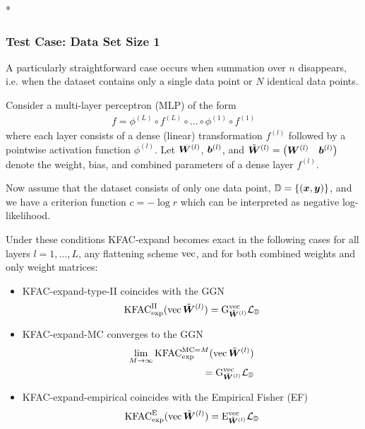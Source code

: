 \switchcolumn[1]*
\switchcolumn[0]

\subsubsection{Test Case: Data Set Size 1}
A particularly straightforward case occurs when summation over $n$ disappears, i.e. when the dataset contains only a single data point or $N$ identical data points. 

\begin{test}\label{test:kfac_expand_linear_no_weight_sharing_batch_size_1}
  Consider a multi-layer perceptron (MLP) of the form
  \begin{align*}
    f = \phi^{(L)} \circ f^{(L)} \circ \ldots \circ \phi^{(1)} \circ f^{(1)}
  \end{align*}
  where each layer consists of a dense (linear) transformation $f^{(l)}$ followed by a pointwise activation function $\phi^{(l)}$.
  Let $\mW^{(l)}$, $\vb^{(l)}$, and $\tilde{\mW}^{(l)} = \begin{pmatrix} \mW^{(l)} & \vb^{(l)} \end{pmatrix}$ denote the weight, bias, and combined parameters of a dense layer $f^{(l)}$.

  Now assume that the dataset consists of only one data point, $\sD = \{ (\vx, \vy) \}$, and we have a criterion function $c = - \log r$ which can be interpreted as negative log-likelihood.
  
  Under these conditions KFAC-expand becomes exact in the following cases for all layers $l = 1, \dots, L$, any flattening scheme $\vec$, and for both combined weights and only weight matrices:
  \begin{itemize}
  \item KFAC-expand-type-II coincides with the GGN
    \begin{align*}
      \kfac^{\text{II}}_{\text{exp}}(\vec\tilde{\mW}^{(l)}) = \ggn^{\vec}_{\tilde{\mW}^{(l)}}\gL_{\sD}
    \end{align*}
  \item KFAC-expand-MC converges to the GGN
    \begin{align*}
      \lim_{M \to \infty} \kfac^{\text{MC}=M}_{\text{exp}}(\vec\tilde{\mW}^{(l)})
      \\
      = \ggn^{\vec}_{\tilde{\mW}^{(l)}}\gL_{\sD}
    \end{align*}
  \item KFAC-expand-empirical coincides with the Empirical Fisher (EF)
    \begin{align*}
      \kfac^{\text{E}}_{\text{exp}}(\vec\tilde{\mW}^{(l)}) = \ef^{\vec}_{\tilde{\mW}^{(l)}}\gL_{\sD}
    \end{align*}
  \end{itemize}
\end{test}

